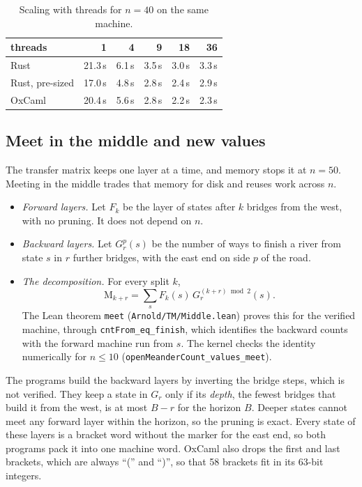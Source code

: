 \documentclass[11pt]{amsart}
\theoremstyle{definition}
\theoremstyle{remark}
\newcommand{\Open}{\mathrm{M}}
\newcommand{\code}[1]{\texttt{#1}}
\begin{document}
\begin{table}[t]
\centering
\begin{tabular}{lrrrrr}
\toprule
threads & 1 & 4 & 9 & 18 & 36 \\
\midrule
Rust            & 21.3\,s & 6.1\,s & 3.5\,s & 3.0\,s & 3.3\,s \\
Rust, pre-sized & 17.0\,s & 4.8\,s & 2.8\,s & 2.4\,s & 2.9\,s \\
OxCaml          & 20.4\,s & 5.6\,s & 2.8\,s & 2.2\,s & 2.3\,s \\
\bottomrule
\end{tabular}
\caption{Scaling with threads for $n = 40$ on the same machine.}\label{tab:scaling}
\end{table}

\subsection{Meet in the middle and new values}\label{sec:mitm}
The transfer matrix keeps one layer at a time, and memory stops it at $n = 50$. Meeting in the
middle trades that memory for disk and reuses work across $n$.

\begin{itemize}
  \item \emph{Forward layers.} Let $F_k$ be the layer of states after $k$ bridges from the
    west, with no pruning. It does not depend on $n$.
  \item \emph{Backward layers.} Let $G^p_r(s)$ be the number of ways to finish a river from
    state $s$ in $r$ further bridges, with the east end on side $p$ of the road.
  \item \emph{The decomposition.} For every split $k$,
\[
  \Open_{k+r} = \sum_s F_k(s)\, G^{(k+r) \bmod 2}_r(s).
\]
    The Lean theorem \code{meet} (\code{Arnold/TM/Middle.lean}) proves this for the verified
    machine, through \code{cntFrom\_eq\_finish}, which identifies the backward counts with
    the forward machine run from $s$. The kernel checks the identity numerically for
    $n \le 10$ (\code{openMeanderCount\_values\_meet}).
\end{itemize}

The programs build the backward layers by inverting the bridge steps, which is not verified.
They keep a state in $G_r$ only if its \emph{depth}, the fewest bridges that build it from the
west, is at most $B - r$ for the horizon $B$. Deeper states cannot meet any forward layer
within the horizon, so the pruning is exact. Every state of these layers is a bracket word
without the marker for the east end, so both programs pack it into one machine word. OxCaml
also drops the first and last brackets, which are always ``('' and ``)'', so that 58 brackets
fit in its 63-bit integers.
\end{document}
